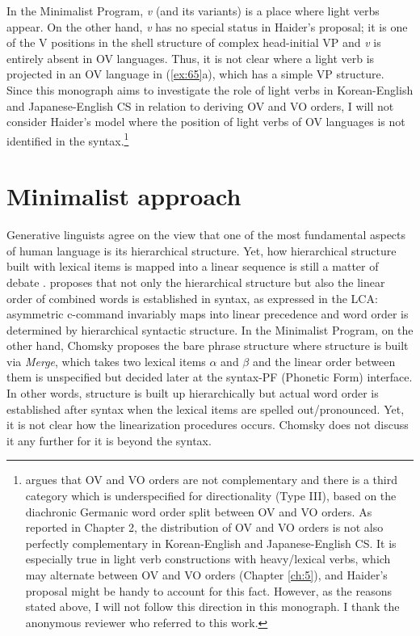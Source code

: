 In the Minimalist Program, \textit{v} (and its variants) is a place where light verbs appear. On the other hand, \textit{v} has no special status in Haider’s proposal; it is one of the V positions in the shell structure of complex head-initial \ac{VP} and \textit{v} is entirely absent in \ac{OV} languages. Thus, it is not clear where a light verb is projected in an \ac{OV} language in (\ref{ex:65}a), which has a simple \ac{VP} structure. Since this monograph aims to investigate the role of light verbs in Korean-English and Japanese-English \ac{CS} in relation to deriving \ac{OV} and \ac{VO} orders, I will not consider Haider’s model where the position of light verbs of \ac{OV} languages is not identified in the syntax.\footnote{\citet{Haider2013} argues that \ac{OV} and \ac{VO} orders are not complementary and there is a third category which is underspecified for directionality (Type III), based on the diachronic Germanic word order split between \ac{OV} and \ac{VO} orders. As reported in Chapter 2, the distribution of \ac{OV} and \ac{VO} orders is not also perfectly complementary in Korean-English and Japanese-English \ac{CS}. It is especially true in light verb constructions with heavy/lexical verbs, which may alternate between \ac{OV} and \ac{VO} orders (Chapter \ref{ch:5}), and Haider’s proposal might be handy to account for this fact. However, as the reasons stated above, I will not follow this direction in this monograph. I thank the anonymous reviewer who referred to this work.}

\section{Minimalist approach}\label{ch3:sect:3.3}
\largerpage%
Generative linguists agree on the view that one of the most fundamental aspects of human language is its hierarchical structure. Yet, how hierarchical structure built with lexical items is mapped into a linear sequence is still a matter of debate \citep{Barrie2012}. \citet{Kayne1994} proposes that not only the hierarchical structure but also the linear order of combined words is established in syntax, as expressed in the \ac{LCA}: asymmetric c-command invariably maps into linear precedence and word order is determined by hierarchical syntactic structure. In the Minimalist Program, on the other hand, Chomsky proposes the bare phrase structure where structure is built via \textit{Merge}, which takes two lexical items ${\alpha}$ and ${\beta}$ and the linear order between them is unspecified but decided later at the syntax-\ac{PF} (Phonetic Form) interface. In other words, structure is built up hierarchically but actual word order is established after syntax when the lexical items are spelled out/pronounced. Yet, it is not clear how the linearization procedures occurs. Chomsky does not discuss it any further for it is beyond the syntax. 


